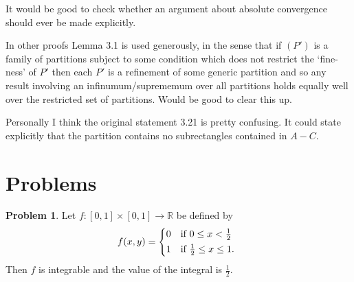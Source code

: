 \documentclass[20pt]{article}
\theoremstyle{plain}
\theoremstyle{definition}
\newtheorem*{problem}{Problem}
\newcommand{\reals}{\mathbb{R}}
\begin{document}
It would be good to check whether an argument about absolute convergence should ever be made explicitly.  

In other proofs Lemma 3.1 is used generously, in the sense that if $(P')$ 
is a family of partitions subject to some condition which does not restrict the
`fine-ness' of $P'$
then each $P'$ is a refinement of some generic partition and so any result 
involving an infinumum/suprememum over all partitions holds equally well over
the restricted set of partitions.  Would be good to clear this up.

Personally I think the original statement 3.21 is pretty confusing.  It could 
state explicitly that the partition contains no subrectangles contained in $A-C.$
\vspace{3em}













































\break
\section{Problems}

\begin{problem}{3.1}
  Let $f: [0,1] \times [0, 1] \to \reals$ be defined by
 \begin{equation*}
    f(x, y) =
    \begin{cases*}
      0 & if $0 \leq x < \frac{1}{2}$ \\
      1 & if $ \frac{1}{2} \leq x \leq 1 $.
    \end{cases*}
  \end{equation*}
Then $f$ is integrable and the value of the integral is $\frac{1}{2}.$
\end{problem}
\end{document}
